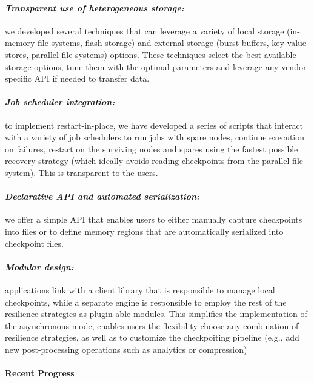 \paragraph{\emph{Transparent use of heterogeneous storage:}} we
developed several techniques that can leverage a variety of local
storage (in-memory file systems, flash storage) and external storage
(burst buffers, key-value stores, parallel file systems)
options. These techniques select the best available storage options,
tune them with the optimal parameters and leverage any vendor-specific
API if needed to transfer data.
\vspace{-1em}

\paragraph{\emph{Job scheduler integration:}} to implement
restart-in-place, we have developed a series of scripts that interact
with a variety of job schedulers to run jobs with spare nodes,
continue execution on failures, restart on the surviving nodes and
spares using the fastest possible recovery strategy (which ideally
avoids reading checkpoints from the parallel file system). This is
transparent to the users.
\vspace{-1em}

\paragraph{\emph{Declarative API and automated serialization:}} we
offer a simple API that enables users to either manually capture
checkpoints into files or to define memory regions that are
automatically serialized into checkpoint files.
\vspace{-1em}

\paragraph{\emph{Modular design:}} applications link with a client
library that is responsible to manage local checkpoints, while a
separate engine is responsible to employ the rest of the resilience
strategies as plugin-able modules. This simplifies the implementation
of the asynchronous mode, enables users the flexibility choose any
combination of resilience strategies, as well as to customize the
checkpoiting pipeline (e.g., add new post-processing operations such
as analytics or compression)

\paragraph{Recent Progress}

